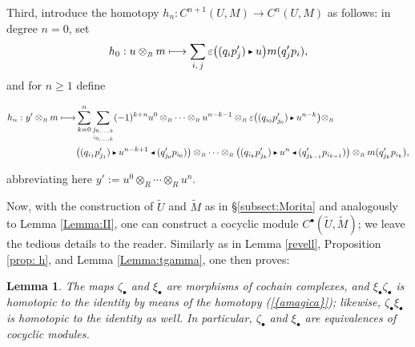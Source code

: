 \documentclass[reqno, a4paper, 10pt]{amsart}
\numberwithin{equation}{section}
\theoremstyle{plain}
\newtheorem{lem}[theorem]{Lemma}
\theoremstyle{definition}
\theoremstyle{remark}
\begin{document}
Third, introduce the homotopy $h_n: C^{n+1}(U, M) \to C^{n}(U,M)$ as follows: in degree $n=0$, set 
$$
h_0: u \otimes_{{\scriptscriptstyle{R}}} m \longmapsto \sum_{i,\,j} {\varepsilon}\big((q_i p'_j) {{\,\raise1pt\hbox{$\scriptscriptstyle{\blacktriangleright}$} \, }} u\big) m(q'_jp_i),
$$
and for $n\geq 1$ define
\begin{footnotesize}
\begin{equation}
\begin{split}
\label{amagica}
h_n: y' \otimes_{{\scriptscriptstyle{R}}} m  \longmapsto 
& \sum^n_{k=0}  \underset{\underset{i_{0, \ldots, k}}{j_{0,\ldots, k}}}{\sum}  (-1)^{k+n} 
u^0 \otimes_{{\scriptscriptstyle{R}}} \cdots \otimes_{{\scriptscriptstyle{R}}} u^{n-k-1} \otimes_{{\scriptscriptstyle{R}}} {\varepsilon}\big((q_{i_0} p'_{j_0}) {{\,\raise1pt\hbox{$\scriptscriptstyle{\blacktriangleright}$} \, }} u^{n-k}\big) \otimes_{{\scriptscriptstyle{R}}} \\
&  
{\big( { (q_{i_1}p'_{j_1}) {{\,\raise1pt\hbox{$\scriptscriptstyle{\blacktriangleright}$} \, }} u^{n-k+1} {{\,\raise1pt\hbox{$\scriptscriptstyle{\blacktriangleleft}$} \, }} (q'_{j_0}p_{i_0}) } \big)}
\otimes_{{\scriptscriptstyle{R}}}   \cdots  \otimes_{{\scriptscriptstyle{R}}}
{\big( { (q_{i_k}p'_{j_k}) {{\,\raise1pt\hbox{$\scriptscriptstyle{\blacktriangleright}$} \, }} u^{n} {{\,\raise1pt\hbox{$\scriptscriptstyle{\blacktriangleleft}$} \, }} (q'_{j_{k-1}}p_{i_{k-1}}) } \big)} \otimes_{{\scriptscriptstyle{R}}} m(q'_{j_k}p_{i_k}),
\end{split}
\end{equation}
\end{footnotesize}
abbreviating here $y':=u^0 \otimes_{{\scriptscriptstyle{R}}} \cdots \otimes_{{\scriptscriptstyle{R}}} u^n$. 
 

Now, with the construction of ${\tilde{{U}}}$ and ${\tilde{{M}}}$ as in \S\ref{subsect:Morita} and analogously to Lemma \ref{Lemma:II}, one can construct a cocyclic module $C^{{\scriptscriptstyle{\bullet}}}({\tilde{{U}}}, {\tilde{{M}}})$; we leave the tedious details to the reader. 
Similarly as in Lemma \ref{revell}, Proposition \ref{prop: h}, and Lemma \ref{Lemma:tgamma}, one then proves:
\begin{lem}
The maps $\zeta_{{\scriptscriptstyle{\bullet}}}$ and $\xi_{{\scriptscriptstyle{\bullet}}}$ are morphisms of cochain complexes, and $\xi_{{\scriptscriptstyle{\bullet}}} \zeta_{{\scriptscriptstyle{\bullet}}}$ is homotopic to the identity by means of the homotopy {{\rm (}\ref{{amagica}}{\rm )}}; likewise, $\zeta_{{\scriptscriptstyle{\bullet}}} \xi_{{\scriptscriptstyle{\bullet}}}$ is homotopic to the identity as well. In particular, $\zeta_{{\scriptscriptstyle{\bullet}}}$ and $\xi_{{\scriptscriptstyle{\bullet}}}$ are equivalences of cocyclic modules.
\end{lem}
\end{document}
